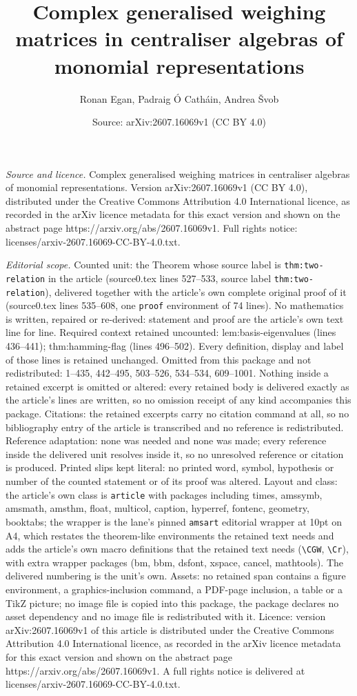\documentclass[10pt,a4paper]{amsart}
\title[Complex generalised weighing matrices in centraliser algebra]{Complex generalised weighing matrices in centraliser algebras of monomial representations}
\author{Ronan Egan, Padraig \'O Cath\'ain, Andrea \v{S}vob}
\date{Source: arXiv:2607.16069v1 (CC BY 4.0)}
\begin{document}
\maketitle

\noindent\emph{Source and licence.} Complex generalised weighing matrices in centraliser algebras of monomial representations. Version arXiv:2607.16069v1 (CC BY 4.0), distributed under the Creative Commons Attribution 4.0 International licence, as recorded in the arXiv licence metadata for this exact version and shown on the abstract page https://arxiv.org/abs/2607.16069v1. Full rights notice: licenses/arxiv-2607.16069-CC-BY-4.0.txt.\par\smallskip

\noindent\textit{Editorial scope.} Counted unit: the Theorem whose source label is \texttt{thm:two-relation} in the article (source0.tex lines 527--533, source label \texttt{thm:two-relation}), delivered together with the article's own complete original proof of it (source0.tex lines 535--608, one \texttt{proof} environment of 74 lines). No mathematics is written, repaired or re-derived: statement and proof are the article's own text line for line. Required context retained uncounted: lem:basis-eigenvalues (lines 436--441); thm:hamming-flag (lines 496--502). Every definition, display and label of those lines is retained unchanged. Omitted from this package and not redistributed: 1--435, 442--495, 503--526, 534--534, 609--1001. Nothing inside a retained excerpt is omitted or altered: every retained body is delivered exactly as the article's lines are written, so no omission receipt of any kind accompanies this package. Citations: the retained excerpts carry no citation command at all, so no bibliography entry of the article is transcribed and no reference is redistributed. Reference adaptation: none was needed and none was made; every reference inside the delivered unit resolves inside it, so no unresolved reference or citation is produced. Printed slips kept literal: no printed word, symbol, hypothesis or number of the counted statement or of its proof was altered. Layout and class: the article's own class is \texttt{article} with packages including times, amssymb, amsmath, amsthm, float, multicol, caption, hyperref, fontenc, geometry, booktabs; the wrapper is the lane's pinned \texttt{amsart} editorial wrapper at 10pt on A4, which restates the theorem-like environments the retained text needs and adds the article's own macro definitions that the retained text needs (\texttt{\textbackslash CGW}, \texttt{\textbackslash Cr}), with extra wrapper packages (bm, bbm, dsfont, xspace, cancel, mathtools). The delivered numbering is the unit's own. Assets: no retained span contains a figure environment, a graphics-inclusion command, a PDF-page inclusion, a table or a TikZ picture; no image file is copied into this package, the package declares no asset dependency and no image file is redistributed with it. Licence: version arXiv:2607.16069v1 of this article is distributed under the Creative Commons Attribution 4.0 International licence, as recorded in the arXiv licence metadata for this exact version and shown on the abstract page https://arxiv.org/abs/2607.16069v1. A full rights notice is delivered at licenses/arxiv-2607.16069-CC-BY-4.0.txt. 
\end{document}
